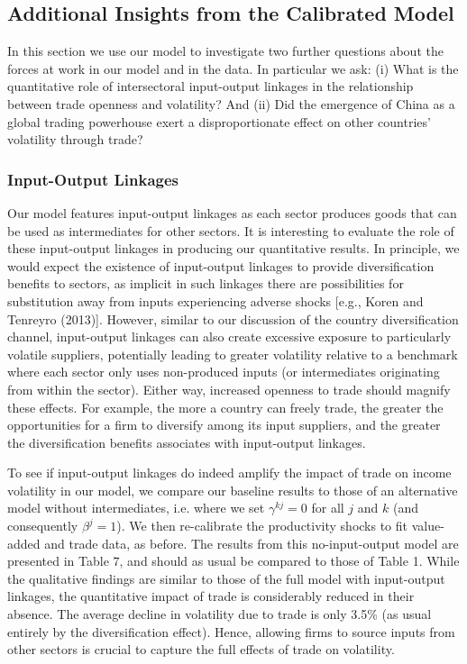 \documentclass[12pt]{article}
\begin{document}
\subsection{Additional Insights from the Calibrated Model}

In this section we use our model to investigate two further questions about
the forces at work in our model and in the data. In particular we ask: (i)
What is the quantitative role of intersectoral input-output linkages in the
relationship between trade openness and volatility? And (ii) Did the
emergence of China as a global trading powerhouse exert a disproportionate
effect on other countries' volatility through trade?

\subsubsection{Input-Output Linkages}

Our model features input-output linkages as each sector produces goods that
can be used as intermediates for other sectors. It is interesting to
evaluate the role of these input-output linkages in producing our
quantitative results. In principle, we would expect the existence of
input-output linkages to provide diversification benefits to sectors, as
implicit in such linkages there are possibilities for substitution away from
inputs experiencing adverse shocks [e.g., Koren and Tenreyro (2013)].
However, similar to our discussion of the country diversification channel,
input-output linkages can also create excessive exposure to particularly
volatile suppliers, potentially leading to greater volatility relative to a
benchmark where each sector only uses non-produced inputs (or intermediates
originating from within the sector). Either way, increased openness to trade
should magnify these effects. For example, the more a country can freely
trade, the greater the opportunities for a firm to diversify among its input
suppliers, and the greater the diversification benefits associates with
input-output linkages.

To see if input-output linkages do indeed amplify the impact of trade on
income volatility in our model, we compare our baseline results to those of
an alternative model without intermediates, i.e. where we set $\gamma
^{kj}=0 $ for all $j$ and $k$ (and consequently $\beta^j =1$). We then
re-calibrate the productivity shocks to fit
value-added and trade data, as before. The results from this no-input-output
model are presented in Table $7$, and should as usual be compared to those
of Table 1. While the qualitative findings are similar to those of the full
model with input-output linkages, the quantitative impact of trade is
considerably reduced in their absence. The average decline in volatility due
to trade is only 3.5\% (as usual entirely by the diversification effect).
Hence, allowing firms to source inputs from other sectors is crucial to
capture the full effects of trade on volatility.
\end{document}
